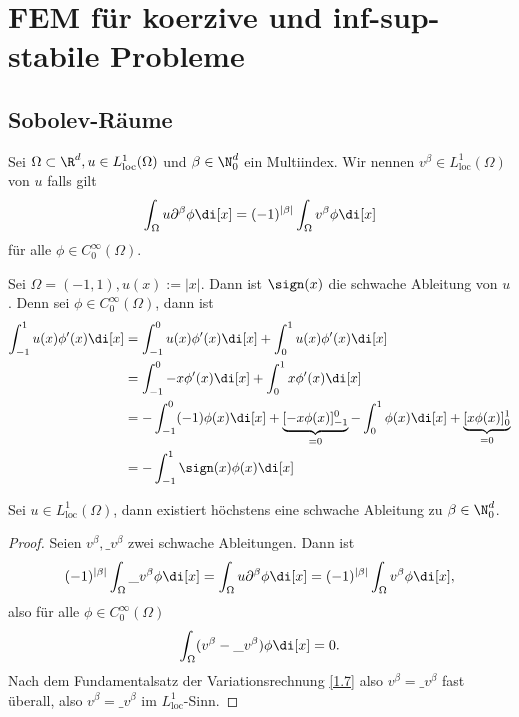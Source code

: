 \chapter{FEM für koerzive und inf-sup-stabile Probleme} \label{chap:3}


\section{Sobolev-Räume} \label{sec:3.1}


\begin{df} \label{3.1}
	Sei $\Omega \subset \R^d, u \in L_{\text{loc}}^1(\Omega)$ und $\beta \in \N_0^d$ ein Multiindex.
	Wir nennen $v^\beta \in L_{\text{loc}}^1(\Omega)$  von $u$ falls gilt
	\[
		\int_\Omega u \partial^\beta \phi \di[x]
		= (-1)^{|\beta|} \int_\Omega v^\beta \phi \di[x]
	\]
	für alle $\phi \in C_0^\infty(\Omega)$.
\end{df}

\begin{ex*}
	Sei $\Omega = (-1, 1), u(x) := |x|$.
	Dann ist $\sign(x)$ die schwache Ableitung von $u$.
	Denn sei $\phi \in C_0^\infty(\Omega)$, dann ist
	\begin{align*}
		\int_{-1}^1 u(x) \phi'(x) \di[x]
		&= \int_{-1}^0 u(x) \phi'(x) \di[x]
		+ \int_0^1 u(x) \phi'(x) \di[x] \\
		&= \int_{-1}^0 -x \phi'(x) \di[x]
		+ \int_0^1 x \phi'(x) \di[x] \\
		&= - \int_{-1}^0 (-1) \phi(x) \di[x] + \underbrace{[-x \phi(x)]_{-1}^0}_{=0}
		- \int_0^1 \phi(x) \di[x] + \underbrace{[x \phi(x)]_0^1}_{=0} \\
		&= - \int_{-1}^1 \sign(x) \phi(x) \di[x]
	\end{align*}
\end{ex*}

\begin{st}[Eindeutigkeit] \label{3.2}
	Sei $u \in L^1_{\text{loc}}(\Omega)$, dann existiert höchstens eine schwache Ableitung zu $\beta \in \N_0^d$.
	\begin{proof}
		Seien $v^\beta, \_v^\beta$ zwei schwache Ableitungen.
		Dann ist
		\[
			(-1)^{|\beta|} \int_\Omega \_v^\beta \phi \di[x]
			= \int_\Omega u \partial^\beta \phi \di[x]
			= (-1)^{|\beta|} \int_\Omega v^\beta \phi \di[x],
		\]
		also für alle $\phi \in C_0^\infty(\Omega)$
		\[
			\int_\Omega (v^\beta - \_v^\beta) \phi \di[x] = 0.
		\]
		Nach dem Fundamentalsatz der Variationsrechnung \ref{1.7} also $v^\beta = \_v^\beta$ fast überall, also $v^\beta = \_v^\beta$ im $L^1_{\text{loc}}$-Sinn.
	\end{proof}
\end{st}

